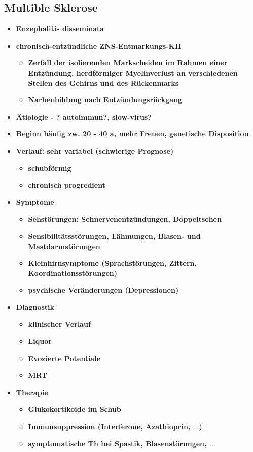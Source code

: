 	\subsection{Multible Sklerose}
		\begin{itemize}
			\item \textbf{Enzephalitis disseminata}
			\item \textbf{chronisch-entzündliche ZNS-Entmarkungs-KH}
				\begin{itemize}
					\item \textbf{Zerfall der isolierenden Markscheiden im Rahmen einer Entzündung, herdförmiger Myelinverlust an verschiedenen Stellen des Gehirns und des Rückenmarks}
					\item \textbf{Narbenbildung nach Entzündungsrückgang}
				\end{itemize}
			\item \textbf{Ätiologie - ? autoimmun?, slow-virus?}
			\item \textbf{Beginn häufig zw. 20 - 40 a, mehr Freuen, genetische Disposition}
			\item \textbf{Verlauf: sehr variabel (schwierige Prognose)}
				\begin{itemize}
					\item \textbf{schubförmig}
					\item \textbf{chronisch progredient}
				\end{itemize}
			\item \textbf{Symptome}
				\begin{itemize}
					\item \textbf{Sehstörungen: Sehnervenentzündungen, Doppeltsehen}
					\item \textbf{Sensibilitätsstörungen, Lähmungen, Blasen- und Mastdarmstörungen}
					\item \textbf{Kleinhirnsymptome (Sprachstörungen, Zittern, Koordinationsstörungen)}
					\item \textbf{psychische Veränderungen (Depressionen)}
				\end{itemize}
			\item \textbf{Diagnostik}
				\begin{itemize}
					\item \textbf{klinischer Verlauf}
					\item \textbf{Liquor}
					\item \textbf{Evozierte Potentiale}
					\item \textbf{MRT}
				\end{itemize}
			\item \textbf{Therapie}
				\begin{itemize}
					\item \textbf{Glukokortikoide im Schub}
					\item \textbf{Immunsuppression (Interferone, Azathioprin, $\dots$)}
					\item \textbf{symptomatische Th bei Spastik, Blasenstörungen, $\dots$}
				\end{itemize}
		\end{itemize}

